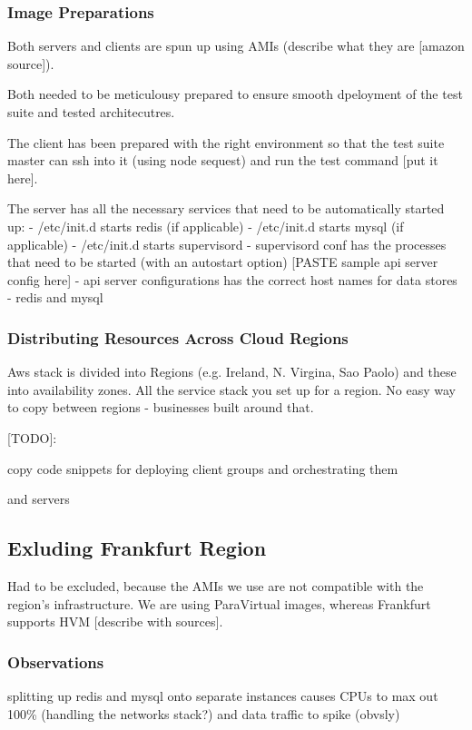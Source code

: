 \documentclass{uvamscse}
\begin{document}
\subsubsection{Image Preparations}
Both servers and clients are spun up using AMIs (describe what they are [amazon source]).

Both needed to be meticulousy prepared to ensure smooth dpeloyment of the test suite and tested architecutres.

The client has been prepared with the right environment so that the test suite master can ssh into it (using node sequest) and run the test command [put it here].

The server has all the necessary services that need to be automatically started up:
- /etc/init.d starts redis (if applicable)
- /etc/init.d starts mysql (if applicable)
- /etc/init.d starts supervisord
    - supervisord conf has the processes that need to be started (with an autostart option) [PASTE sample api server config here]
- api server configurations has the correct host names for data stores - redis and mysql

\subsubsection{Distributing Resources Across Cloud Regions}

Aws stack is divided into Regions (e.g. Ireland, N. Virgina, Sao Paolo) and these into availability zones. All the service stack you set up for a region. No easy way to copy between regions - businesses built around that.

[TODO]:

copy code snippets for deploying client groups and orchestrating them 

and servers

\subsection{Exluding Frankfurt Region}

Had to be excluded, because the AMIs we use are not compatible with the region's infrastructure. We are using ParaVirtual images, whereas Frankfurt supports HVM [describe with sources].

\subsubsection{Observations}

splitting up redis and mysql onto separate instances causes CPUs to max out 100\% (handling the networks stack?) and data traffic to spike (obvsly)
\end{document}
